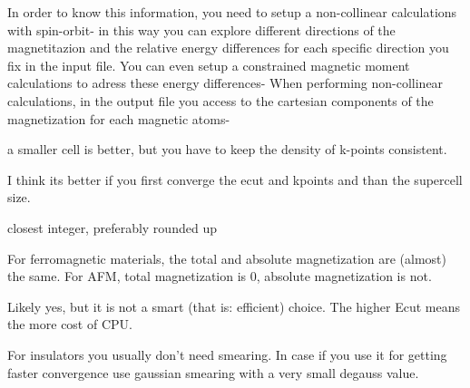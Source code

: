 
  In order to know this information, you need to setup a non-collinear calculations with spin-orbit-  in  this way you can explore different directions of the magnetitazion and
  the relative energy differences for each specific direction you fix in
  the input file.
  You can even setup a constrained magnetic moment calculations to adress these energy differences-
  When
  performing non-collinear calculations, in the output file you access to
  the cartesian components of the magnetization for each magnetic atoms-


  a smaller cell is better, but you have to keep the density of k-points consistent.

  I think its better if you first converge the  ecut and kpoints and than the supercell size.


  closest integer, preferably rounded up


  For ferromagnetic materials, the total and absolute magnetization are (almost) the same. For AFM, total magnetization is 0, absolute magnetization is not.


  Likely yes, but it is not a smart (that is: efficient) choice. The higher Ecut means the more cost of CPU.


  For insulators you usually don’t need smearing. In case if you use it for getting faster convergence use gaussian smearing with a very small degauss value.

